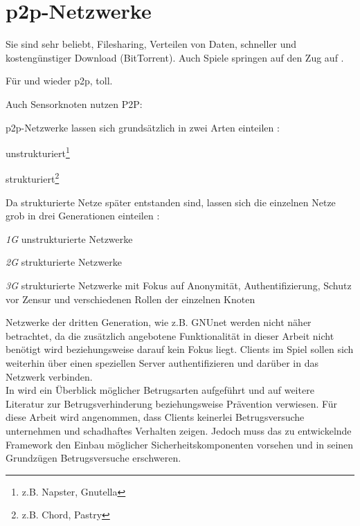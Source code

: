 \section{p2p-Netzwerke}
\label{chap:grundlagen:p2p}
Sie sind sehr beliebt, Filesharing, Verteilen von Daten, schneller und kostengünstiger Download (BitTorrent). Auch Spiele springen auf den Zug auf \cite{Knutsson2004Peertopeer, Triebel2008Peertopeer}.

Für und wieder \ac{p2p}, toll. \cite{Roussopoulos20032} 

Auch Sensorknoten nutzen P2P: \cite{MuneebAliandKoenLangendoen2007Case}

p2p-Netzwerke lassen sich grundsätzlich in zwei Arten einteilen \cite{Steinmetz2005, Lua2005Survey}: 
\begin{itemize*}
\item unstrukturiert\footnote{z.B. Napster, Gnutella}
\item strukturiert\footnote{z.B. Chord, Pastry}
\end{itemize*}

Da strukturierte Netze später entstanden sind, lassen sich die einzelnen Netze grob in drei Generationen einteilen \cite{Bo2003PeertoPeer}:
\begin{itemize*}
	\item \emph{1G} unstrukturierte Netzwerke
	\item \emph{2G} strukturierte Netzwerke
	\item \emph{3G} strukturierte Netzwerke mit Fokus auf Anonymität, Authentifizierung, Schutz vor Zensur und verschiedenen Rollen der einzelnen Knoten
\end{itemize*}

Netzwerke der dritten Generation, wie z.B. GNUnet \cite{Bennett2002GNet} werden nicht näher betrachtet, da die zusätzlich angebotene Funktionalität in dieser Arbeit nicht benötigt wird beziehungsweise darauf kein Fokus liegt. Clients im Spiel sollen sich weiterhin über einen speziellen Server authentifizieren und darüber in das Netzwerk verbinden.\\
In  wird ein Überblick möglicher Betrugsarten aufgeführt und auf weitere Literatur zur Betrugsverhinderung beziehungsweise Prävention verwiesen. Für diese Arbeit wird angenommen, dass Clients keinerlei Betrugsversuche unternehmen und schadhaftes Verhalten zeigen. Jedoch muss das zu entwickelnde Framework den Einbau möglicher Sicherheitskomponenten vorsehen und in seinen Grundzügen Betrugsversuche erschweren.

